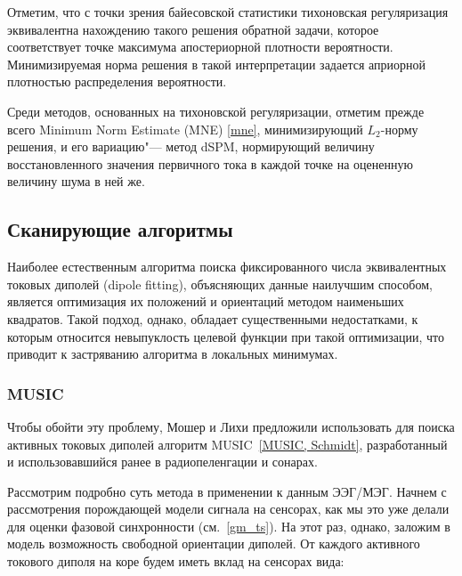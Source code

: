 Отметим, что с точки зрения байесовской статистики тихоновская регуляризация
эквивалентна нахождению такого решения обратной задачи, которое соответствует
точке максимума апостериорной плотности вероятности. Минимизируемая норма решения в такой
интерпретации задается априорной плотностью распределения вероятности.

Среди методов, основанных на тихоновской регуляризации, отметим прежде всего
Minimum Norm Estimate (MNE) \ref{mne}, минимизирующий $L_2$-норму решения,
и его вариацию"--- метод dSPM, нормирующий величину восстановленного значения первичного
тока в каждой точке на оцененную величину шума в ней же.

\subsection{Сканирующие алгоритмы} \label{sect_dics}


Наиболее естественным алгоритма поиска фиксированного числа эквивалентных
токовых диполей (dipole fitting), объясняющих данные наилучшим способом,
является оптимизация их положений и ориентаций методом наименьших квадратов.
Такой подход, однако, обладает существенными недостатками, к которым относится
невыпуклость целевой функции при такой оптимизации,
что приводит к застряванию алгоритма в локальных минимумах.

\subsubsection{MUSIC}
Чтобы обойти эту проблему, Мошер и Лихи предложили использовать для
поиска активных токовых диполей алгоритм MUSIC~\ref{MUSIC, Schmidt}, разработанный
и использовавшийся ранее в радиопеленгации и сонарах.

Рассмотрим подробно суть метода в применении к данным ЭЭГ/МЭГ.
Начнем с рассмотрения порождающей модели сигнала на сенсорах, как мы это
уже делали для оценки фазовой синхронности (см.~\ref{gm_ts}).
На этот раз, однако, заложим в модель возможность свободной ориентации диполей.
От каждого активного токового диполя на коре будем иметь вклад на сенсорах вида:

